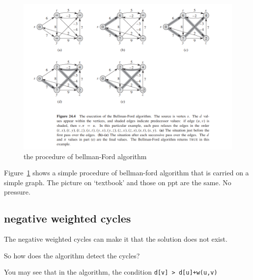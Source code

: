 \documentclass[a4paper, 10pt]{ctexart} %
\begin{document}
\begin{figure}
    \centering
    \includegraphics[scale = 0.5]{sssp6.png}
    \caption{the procedure of bellman-Ford algorithm}
    \label{fig:bellmanford}
\end{figure}
Figure~\ref{fig:bellmanford} shows a simple procedure of bellman-ford algorithm that is carried on 
a simple graph. The picture on `textbook' and those on 
ppt are the same. No pressure.
\subsection{negative weighted cycles}
The negative weighted cycles can make it that
the solution does not exist. 

So how does the algorithm detect the 
cycles?

You may see that in the algorithm, the condition
\verb|d[v] > d[u]+w(u,v)|
\end{document}
